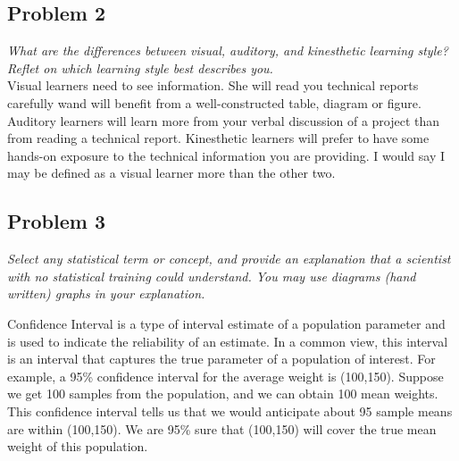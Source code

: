 \documentclass[a4paper,11pt]{article}
\begin{document}
\subsection*{Problem 2}
\emph{\indent What are the differences between visual, auditory, and kinesthetic learning style? Reflet on which learning style best describes you.}
\\

Visual learners need to see information. She will read you technical reports carefully wand will benefit from a well-constructed table, diagram or figure. Auditory learners will learn more from your verbal discussion of a project than from reading a technical report. Kinesthetic learners will prefer to have some hands-on exposure to the technical information you are providing. I would say I may be defined as a visual learner more than the other two.\\


\subsection*{Problem 3}
\emph{\indent Select any statistical term or concept, and provide an explanation that a scientist with no statistical training could understand. You may use diagrams (hand written) graphs in your explanation.}
\begin{paragraph}
{Confidence Interval} is a type of interval estimate of a population parameter and is used to indicate the reliability of an estimate. In a common view, this interval is an interval that captures the true parameter of a population of interest. For example, a 95\% confidence interval for the average weight is (100,150). Suppose we get 100 samples from the population, and we can obtain 100 mean weights. This confidence interval tells us that we would anticipate about 95 sample means are within (100,150). We are 95\% sure that (100,150) will cover the true mean weight of this population.
\end{paragraph}
\end{document}
